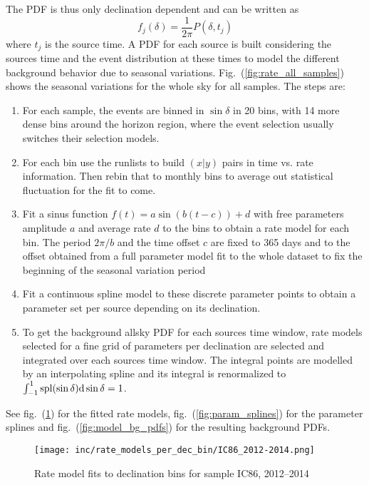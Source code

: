 The PDF is thus only declination dependent and can be written as
\begin{equation}
  f_j(\delta) = \frac{1}{2\pi}P(\delta, t_j)
\end{equation}
where $t_j$ is the source time.
A PDF for each source is built considering the sources time and the event distribution at these times to model the different background behavior due to seasonal variations.
Fig.~(\ref{fig:rate_all_samples}) shows the seasonal variations for the whole sky for all samples.
The steps are:
\begin{enumerate}
  \item For each sample, the events are binned in $\sin\delta$ in 20 bins, with 14 more dense bins around the horizon region, where the event selection usually switches their selection models.
  \item For each bin use the runlists to build $(x|y)$ pairs in time vs. rate information.
  Then rebin that to monthly bins to average out statistical fluctuation for the fit to come.
  \item Fit a sinus function $f(t) = a \sin(b(t-c)) + d$ with free parameters amplitude $a$ and average rate $d$ to the bins to obtain a rate model for each bin.
  The period $2\pi/b$ and the time offset $c$ are fixed to 365 days and to the offset obtained from a full parameter model fit to the whole dataset to fix the beginning of the seasonal variation period
  \item Fit a continuous spline model to these discrete parameter points to obtain a parameter set per source depending on its declination.
  \item To get the background allsky PDF for each sources time window, rate models selected for a fine grid of parameters per declination are selected and integrated over each sources time window.
  The integral points are modelled by an interpolating spline and its integral is renormalized to $\int_{-1}^{1} \mathrm{spl}(\sin\delta) \mathrm{d}\sin\delta = 1$.
\end{enumerate}

See fig.~(\ref{fig:dec_bin_rate_models}) for the fitted rate models, fig.~(\ref{fig:param_splines}) for the parameter splines and fig.~(\ref{fig:model_bg_pdfs}) for the resulting background PDFs.

\begin{figure}[htbp]
  \centering
  \texttt{[image: inc/rate\_models\_per\_dec\_bin/IC86\_2012-2014.png]}
  \caption{Rate model fits to declination bins for sample IC86, 2012–2014}
  \label{fig:dec_bin_rate_models}
\end{figure}

